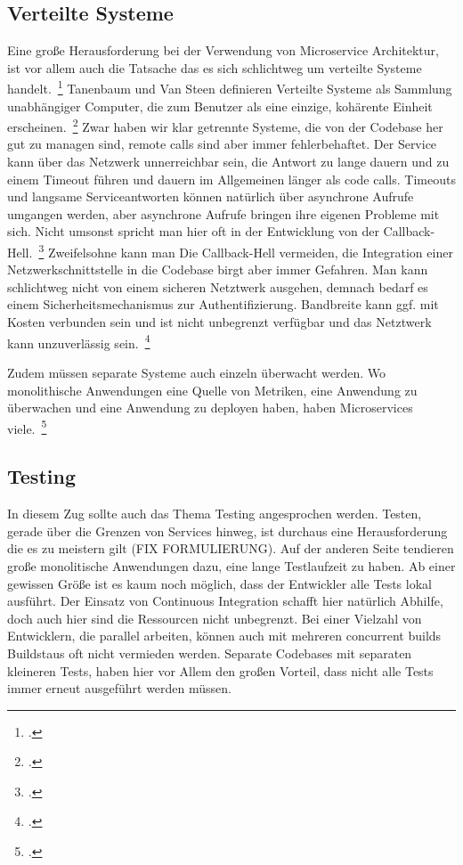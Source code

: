 \subsection{Verteilte Systeme}
Eine große Herausforderung bei der Verwendung von Microservice Architektur, ist vor allem auch die Tatsache das es sich schlichtweg um verteilte Systeme handelt.~\footcite[][]{microtradeoffs}
Tanenbaum und Van Steen definieren Verteilte Systeme als Sammlung unabhängiger Computer, die zum Benutzer als eine einzige, kohärente Einheit erscheinen.~\footcite[][Seite 2]{tanenbaum2002distributed}
Zwar haben wir klar getrennte Systeme, die von der Codebase her gut zu managen sind, remote calls sind aber immer fehlerbehaftet. Der Service kann über das Netzwerk unnerreichbar sein, die Antwort zu lange dauern und zu einem Timeout führen und dauern im Allgemeinen länger als code calls. Timeouts und langsame Serviceantworten können natürlich über asynchrone Aufrufe umgangen werden, aber asynchrone Aufrufe bringen ihre eigenen Probleme mit sich. Nicht umsonst spricht man hier oft in der Entwicklung von der Callback-Hell.~\footcite[vgl.][]{callbackhell} Zweifelsohne kann man Die Callback-Hell vermeiden, die Integration einer Netzwerkschnittstelle in die Codebase birgt aber immer Gefahren. Man kann schlichtweg nicht von einem sicheren Netztwerk ausgehen, demnach bedarf es einem Sicherheitsmechanismus zur Authentifizierung. Bandbreite kann ggf. mit Kosten verbunden sein und ist nicht unbegrenzt verfügbar und das Netztwerk kann unzuverlässig sein.~\footcite[vgl.][]{distributedfallacies}

Zudem müssen separate Systeme auch einzeln überwacht werden. Wo monolithische Anwendungen eine Quelle von Metriken, eine Anwendung zu überwachen und eine Anwendung zu deployen haben, haben Microservices viele.~\footcite[vgl.][]{Heroku:GoMicro}

\subsection{Testing}
In diesem Zug sollte auch das Thema Testing angesprochen werden. Testen, gerade über die Grenzen von Services hinweg, ist durchaus eine Herausforderung die es zu meistern gilt (FIX FORMULIERUNG). Auf der anderen Seite tendieren große monolitische Anwendungen dazu, eine lange Testlaufzeit zu haben. Ab einer gewissen Größe ist es kaum noch möglich, dass der Entwickler alle Tests lokal ausführt. Der Einsatz von Continuous Integration schafft hier natürlich Abhilfe, doch auch hier sind die Ressourcen nicht unbegrenzt. Bei einer Vielzahl von Entwicklern, die parallel arbeiten, können auch mit mehreren concurrent builds Buildstaus oft nicht vermieden werden. Separate Codebases mit separaten kleineren Tests, haben hier vor Allem den großen Vorteil, dass nicht alle Tests immer erneut ausgeführt werden müssen.


